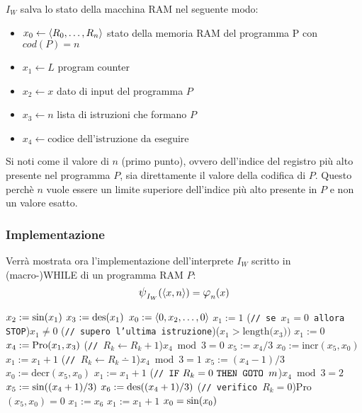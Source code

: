 $I_W$ salva lo stato della macchina RAM nel seguente modo:
\begin{itemize}
    \item $x_0 \leftarrow \langle R_0,\dots,R_{n}\rangle$\hfill
        stato della memoria RAM del programma P con $cod(P)=n$
    \item $x_1 \leftarrow L$ \hfill program counter
    \item $x_2 \leftarrow x$ \hfill dato di input del programma $P$
    \item $x_3 \leftarrow n$ \hfill lista di istruzioni che formano $P$
    \item $x_4 \leftarrow \text{codice dell'istruzione da eseguire}$
\end{itemize}

Si noti come il valore di $n$ (primo punto), ovvero dell'indice del registro più alto 
presente nel programma $P$, sia direttamente il valore della codifica di $P$. Questo
perchè $n$ vuole essere un limite superiore dell'indice più alto presente in $P$ e non
un valore esatto.

\subsubsection*{Implementazione}
Verrà mostrata ora l'implementazione dell'interprete $I_W$ scritto in (macro-)WHILE di un
programma RAM $P$:
$$ \semWHILE_{I_W}(\cantor{x,n})=\semRAM_n(x) $$
\begin{tcolorbox}[colback=white,sharp corners,boxrule=.3mm]
\begin{algorithm}[H]
    \SetAlgoNoEnd
    $x_2 := \text{sin}(x_1)$\;
    $x_3 := \text{des}(x_1)$\;
    $x_0 := \langle0,x_2,\dots,0\rangle$\;
    $x_1 := 1$\;
    \While(\hfill\texttt{// se $x_1=0$ allora STOP}){$x_1\neq 0$}{
        \eIf(\hfill\texttt{// supero l'ultima istruzione}){($x_1>\text{length($x_3$))}$}{
            $x_1:=0$
        }{
            $x_4 := \text{Pro}(x_1,x_3)$
            \If(\hfill\texttt{// }$R_k\leftarrow R_k+1$){$x_4\bmod{3}=0$}{
                $x_5 := x_4 / 3$
                $x_0 := \text{incr}(x_5,x_0)$\;
                $x_1 := x_1+1$\;
            }
            \If(\hfill\texttt{// }$R_k\leftarrow R_k\dotminus1$){$x_4\bmod{3}=1$}{
                $x_5 := (x_4-1) / 3$
                $x_0 := \text{decr}(x_5,x_0)$\;
                $x_1 := x_1+1$\;
            }
            \If(\hfill\texttt{// }$\texttt{IF}\text{ $R_k=0$ }\texttt{THEN GOTO }\text{$m$}$){$x_4\bmod{3}=2$}{
                $x_5 := \text{sin}((x_4+1)/3)$
                $x_6 := \text{des}((x_4+1)/3)$
                \eIf(\hfill\texttt{// verifico }$R_k=0$){Pro$(x_5,x_0)=0$}{
                    $x_1:=x_6$\;
                }{
                    $x_1:=x_1+1$\;
                }
            }
        }
    }
    $x_0 = \text{sin}(x_0)$
\end{algorithm}
\end{tcolorbox}


